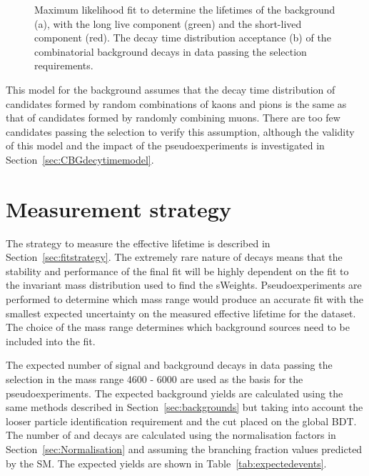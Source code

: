 {\begin{figure}[tbp]
\begin{subfigure}[b]{0.48\textwidth}
   \end{subfigure}
    \caption{Maximum likelihood fit to determine the lifetimes of the background (a), with the long live component (green) and the short-lived component (red). The decay time distribution acceptance (b) of the combinatorial background decays in data passing the \bhh selection requirements.}
    \label{fig:CBGaccpt}
\end{figure}

This model for the background assumes that the decay time distribution of \bhh candidates formed by random combinations of kaons and pions is the same as that of \bsmumu candidates formed by randomly combining muons. There are too few candidates passing the \bsmumu selection to verify this assumption, although the validity of this model and the impact of the pseudoexperiments is investigated in Section~\ref{sec:CBGdecytimemodel}.%


\section{Measurement strategy}%
\label{sec:toys}
The strategy to measure the \bsmumu effective lifetime is described in Section~\ref{sec:fitstrategy}. The extremely rare nature of \bsmumu decays means that the stability and performance of the final fit will be highly dependent on the fit to the invariant mass distribution used to find the sWeights. Pseudoexperiments are performed to determine which mass range would produce an accurate fit with the smallest expected uncertainty on the measured effective lifetime for the dataset. The choice of the mass range determines which background sources need to be included into the fit.


The expected number of signal and background decays in data passing the \bsmumu selection in the mass range 4600 - 6000 \mevcc are used as the basis for the pseudoexperiments. The expected background yields are calculated using the same methods described in Section~\ref{sec:backgrounds} but taking into account the looser particle identification requirement and the cut placed on the global BDT. The number of \bsmumu and \bdmumu decays are calculated using the normalisation factors in Section~\ref{sec:Normalisation} and assuming the branching fraction values predicted by the SM. The expected yields are shown in Table~\ref{tab:expectedevents}. 


}
